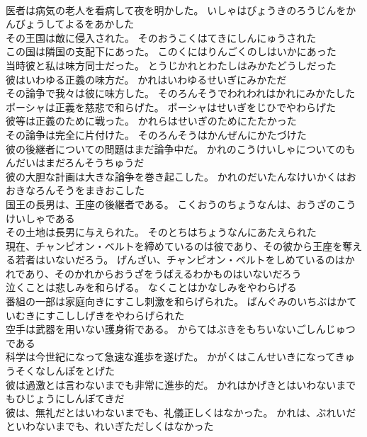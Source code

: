 \documentclass[8pt]{extreport}
\begin{document}
\begin{CJK}{UTF8}{min}
\\	医者は病気の老人を看病して夜を明かした。	いしゃはびょうきのろうじんをかんびょうしてよるをあかした 
\\	その王国は敵に侵入された。	そのおうこくはてきにしんにゅうされた 
\\	この国は隣国の支配下にあった。	このくにはりんごくのしはいかにあった 
\\	当時彼と私は味方同士だった。	とうじかれとわたしはみかたどうしだった 
\\	彼はいわゆる正義の味方だ。	かれはいわゆるせいぎにみかただ 
\\	その論争で我々は彼に味方した。	そのろんそうでわれわれはかれにみかたした 
\\	ポーシャは正義を慈悲で和らげた。	ポーシャはせいぎをじひでやわらげた 
\\	彼等は正義のために戦った。	かれらはせいぎのためにたたかった 
\\	その論争は完全に片付けた。	そのろんそうはかんぜんにかたづけた 
\\	彼の後継者についての問題はまだ論争中だ。	かれのこうけいしゃについてのもんだいはまだろんそうちゅうだ 
\\	彼の大胆な計画は大きな論争を巻き起こした。	かれのだいたんなけいかくはおおきなろんそうをまきおこした 
\\	国王の長男は、王座の後継者である。	こくおうのちょうなんは、おうざのこうけいしゃである 
\\	その土地は長男に与えられた。	そのとちはちょうなんにあたえられた 
\\	現在、チャンピオン・ベルトを締めているのは彼であり、その彼から王座を奪える若者はいないだろう。	げんざい、チャンピオン・ベルトをしめているのはかれであり、そのかれからおうざをうばえるわかものはいないだろう 
\\	泣くことは悲しみを和らげる。	なくことはかなしみをやわらげる 
\\	番組の一部は家庭向きにすこし刺激を和らげられた。	ばんぐみのいちぶはかていむきにすこししげきをやわらげられた 
\\	空手は武器を用いない護身術である。	からてはぶきをもちいないごしんじゅつである 
\\	科学は今世紀になって急速な進歩を遂げた。	かがくはこんせいきになってきゅうそくなしんぽをとげた 
\\	彼は過激とは言わないまでも非常に進歩的だ。	かれはかげきとはいわないまでもひじょうにしんぽてきだ 
\\	彼は、無礼だとはいわないまでも、礼儀正しくはなかった。	かれは、ぶれいだといわないまでも、れいぎただしくはなかった 

\end{CJK}
\end{document}
